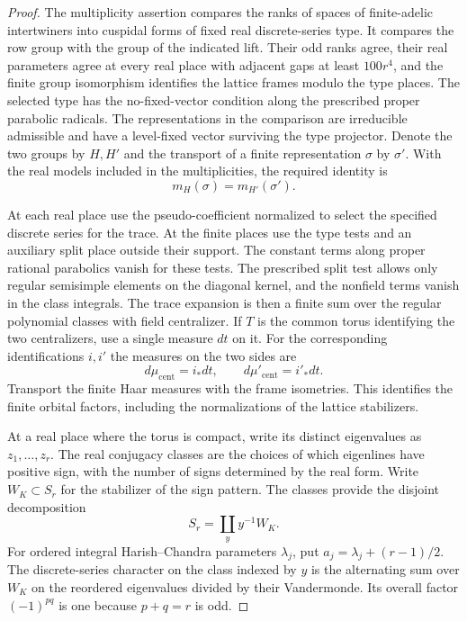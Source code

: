 \begin{proof}
The multiplicity assertion compares the ranks of spaces of
finite-adelic intertwiners into cuspidal forms of fixed real
discrete-series type. It compares the row group with the group
of the indicated lift. Their odd ranks agree, their real
parameters agree at every real place with adjacent gaps at
least \(100r^4\), and the finite group isomorphism identifies
the lattice frames modulo the type places. The selected type
has the no-fixed-vector condition along the prescribed proper
parabolic radicals. The representations in the comparison are
irreducible admissible and have a level-fixed vector surviving
the type projector. Denote the two groups by \(H,H'\) and the
transport of a finite representation \(\sigma\) by \(\sigma'\).
With the real models included in the multiplicities, the required identity is
\[
                         m_H(\sigma)=m_{H'}(\sigma').
\]
\label{cor:automorphic-realization-5}

At each real place use the pseudo-coefficient normalized to
select the specified discrete series for the trace. At the
finite places use the type tests and an auxiliary split place
outside their support. The constant terms along proper
rational parabolics vanish for these tests. The prescribed
split test allows only regular semisimple elements on the
diagonal kernel, and the nonfield terms vanish in the class
integrals. The trace expansion is then a finite sum over
the regular polynomial classes with field centralizer. If \(T\) is the common torus identifying the two centralizers, use a single measure \(dt\) on it. For the corresponding identifications \(i,i'\) the measures on the two sides are
\[
 d\mu_{\mathrm{cent}}=i_*dt,\qquad d\mu'_{\mathrm{cent}}=i'_*dt .
\]
Transport the finite Haar measures with the frame isometries.
This identifies the finite orbital factors, including the
normalizations of the lattice stabilizers.
\label{cor:automorphic-realization-6}

At a real place where the torus is compact, write its distinct
eigenvalues as \(z_1,\ldots,z_r\). The real conjugacy classes
are the choices of which eigenlines have positive sign, with
the number of signs determined by the real form. Write \(W_K\subset S_r\) for the stabilizer of the sign pattern.
The classes provide the disjoint decomposition
\[
                         S_r=\coprod_y y^{-1}W_K .
\] For ordered integral
Harish--Chandra parameters \(\lambda_j\), put
\(a_j=\lambda_j+(r-1)/2\). The discrete-series character
on the class indexed by \(y\) is the alternating sum over
\(W_K\) on the reordered eigenvalues divided by their
Vandermonde. Its overall factor \((-1)^{pq}\) is one
because \(p+q=r\) is odd.


\end{proof}
